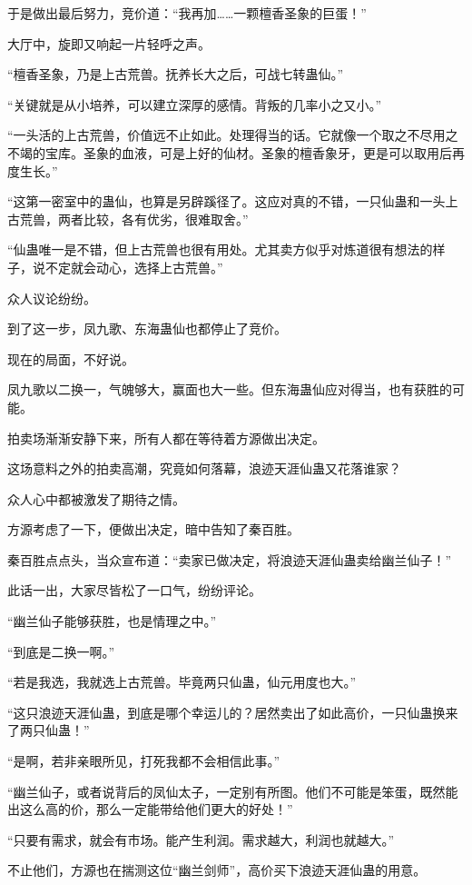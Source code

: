 \begin{this_body}
于是做出最后努力，竞价道：“我再加……一颗檀香圣象的巨蛋！”

大厅中，旋即又响起一片轻呼之声。

“檀香圣象，乃是上古荒兽。抚养长大之后，可战七转蛊仙。”

“关键就是从小培养，可以建立深厚的感情。背叛的几率小之又小。”

“一头活的上古荒兽，价值远不止如此。处理得当的话。它就像一个取之不尽用之不竭的宝库。圣象的血液，可是上好的仙材。圣象的檀香象牙，更是可以取用后再度生长。”

“这第一密室中的蛊仙，也算是另辟蹊径了。这应对真的不错，一只仙蛊和一头上古荒兽，两者比较，各有优劣，很难取舍。”

“仙蛊唯一是不错，但上古荒兽也很有用处。尤其卖方似乎对炼道很有想法的样子，说不定就会动心，选择上古荒兽。”

众人议论纷纷。

到了这一步，凤九歌、东海蛊仙也都停止了竞价。

现在的局面，不好说。

凤九歌以二换一，气魄够大，赢面也大一些。但东海蛊仙应对得当，也有获胜的可能。

拍卖场渐渐安静下来，所有人都在等待着方源做出决定。

这场意料之外的拍卖高潮，究竟如何落幕，浪迹天涯仙蛊又花落谁家？

众人心中都被激发了期待之情。

方源考虑了一下，便做出决定，暗中告知了秦百胜。

秦百胜点点头，当众宣布道：“卖家已做决定，将浪迹天涯仙蛊卖给幽兰仙子！”

此话一出，大家尽皆松了一口气，纷纷评论。

“幽兰仙子能够获胜，也是情理之中。”

“到底是二换一啊。”

“若是我选，我就选上古荒兽。毕竟两只仙蛊，仙元用度也大。”

“这只浪迹天涯仙蛊，到底是哪个幸运儿的？居然卖出了如此高价，一只仙蛊换来了两只仙蛊！”

“是啊，若非亲眼所见，打死我都不会相信此事。”

“幽兰仙子，或者说背后的凤仙太子，一定别有所图。他们不可能是笨蛋，既然能出这么高的价，那么一定能带给他们更大的好处！”

“只要有需求，就会有市场。能产生利润。需求越大，利润也就越大。”

不止他们，方源也在揣测这位“幽兰剑师”，高价买下浪迹天涯仙蛊的用意。


\end{this_body}
